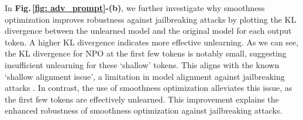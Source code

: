 In \textbf{Fig.\,\ref{fig: adv_prompt}-(b)}, we further investigate why smoothness optimization improves robustness against jailbreaking attacks by plotting the KL divergence between the unlearned model and the original model for each output token. A higher KL divergence indicates more effective unlearning.
%
As we can see, the KL divergence for NPO at the first few tokens is notably small, suggesting insufficient unlearning for these `shallow' tokens. This aligns with the known `shallow alignment issue', a limitation in model alignment against jailbreaking attacks \citep{qi2025safety}. In contrast, the use of smoothness optimization alleviates this issue, as the first few tokens are effectively unlearned. This improvement explains the enhanced robustness of smoothness optimization against jailbreaking attacks.










